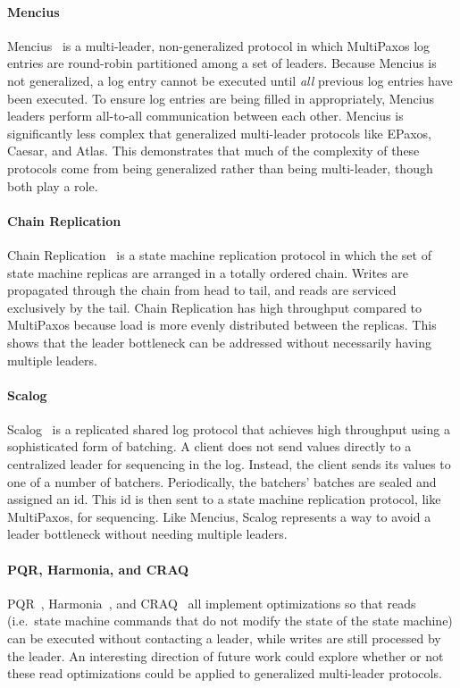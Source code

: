 \paragraph{Mencius}
Mencius~\cite{mao2008mencius} is a multi-leader, non-generalized protocol in
which MultiPaxos log entries are round-robin partitioned among a set of
leaders. Because Mencius is not generalized, a log entry cannot be executed
until \emph{all} previous log entries have been executed. To ensure log entries
are being filled in appropriately, Mencius leaders perform all-to-all
communication between each other. Mencius is significantly less complex that
generalized multi-leader protocols like EPaxos, Caesar, and Atlas. This
demonstrates that much of the complexity of these protocols come from being
generalized rather than being multi-leader, though both play a role.

\paragraph{Chain Replication}
Chain Replication~\cite{van2004chain} is a state machine replication protocol
in which the set of state machine replicas are arranged in a totally ordered
chain. Writes are propagated through the chain from head to tail, and reads are
serviced exclusively by the tail. Chain Replication has high throughput
compared to MultiPaxos because load is more evenly distributed between the
replicas. This shows that the leader bottleneck can be addressed without
necessarily having multiple leaders.

\paragraph{Scalog}
Scalog~\cite{ding2020scalog} is a replicated shared log protocol that achieves
high throughput using a sophisticated form of batching. A client does not send
values directly to a centralized leader for sequencing in the log. Instead, the
client sends its values to one of a number of batchers. Periodically, the
batchers' batches are sealed and assigned an id. This id is then sent to a
state machine replication protocol, like MultiPaxos, for sequencing. Like
Mencius, Scalog represents a way to avoid a leader bottleneck without needing
multiple leaders.

\paragraph{PQR, Harmonia, and CRAQ}
PQR~\cite{charapko2019linearizable}, Harmonia~\cite{zhu2019harmonia}, and
CRAQ~\cite{terrace2009object} all implement optimizations so that reads (i.e.\
state machine commands that do not modify the state of the state machine) can
be executed without contacting a leader, while writes are still processed by
the leader. An interesting direction of future work could explore whether or
not these read optimizations could be applied to generalized multi-leader
protocols.

